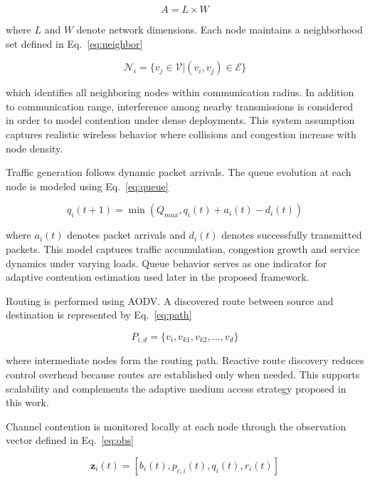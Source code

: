\documentclass[a4paper,fleqn,final,1p]{cas-dc}
\numberwithin{equation}{section}
\begin{document}
\begin{equation}
A=L\times W
\label{eq:area}
\end{equation}

where $L$ and $W$ denote network dimensions. Each node maintains a neighborhood set defined in Eq.~\ref{eq:neighbor}

\begin{equation}
\mathcal N_i=
\{v_j\in \mathcal V|(v_i,v_j)\in\mathcal E\}
\label{eq:neighbor}
\end{equation}

which identifies all neighboring nodes within communication radius. In addition to communication range, interference among nearby transmissions is considered in order to model contention under dense deployments. This system assumption captures realistic wireless behavior where collisions and congestion increase with node density.

Traffic generation follows dynamic packet arrivals. The queue evolution at each node is modeled using Eq.~\ref{eq:queue}

\begin{equation}
q_i(t+1)=
\min
\left(
Q_{max},
q_i(t)+a_i(t)-d_i(t)
\right)
\label{eq:queue}
\end{equation}

where $a_i(t)$ denotes packet arrivals and $d_i(t)$ denotes successfully transmitted packets. This model captures traffic accumulation, congestion growth and service dynamics under varying loads. Queue behavior serves as one indicator for adaptive contention estimation used later in the proposed framework.

Routing is performed using AODV. A discovered route between source and destination is represented by Eq.~\ref{eq:path}

\begin{equation}
P_{i,d}=
\{v_i,v_{k1},v_{k2},...,v_d\}
\label{eq:path}
\end{equation}

where intermediate nodes form the routing path. Reactive route discovery reduces control overhead because routes are established only when needed. This supports scalability and complements the adaptive medium access strategy proposed in this work.

Channel contention is monitored locally at each node through the observation vector defined in Eq.~\ref{eq:obs}

\begin{equation}
\mathbf z_i(t)=
[b_i(t),p_{c,i}(t),q_i(t),r_i(t)]
\label{eq:obs}
\end{equation}
\end{document}
